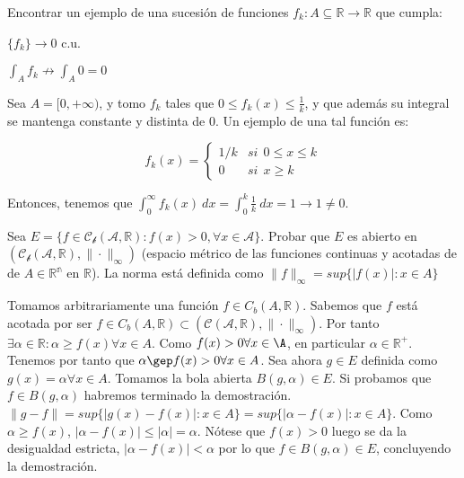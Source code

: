 \begin{ejer}
  Encontrar un ejemplo de una sucesión de funciones $f_k: A \subseteq \mathbb{R} \to \mathbb{R}$ que cumpla:
  \begin{nlist}
  \item $\{f_k\} \to 0$ c.u.
  \item $\displaystyle \int_A f_k \not \to \int_A 0 = 0$
  \end{nlist}
\end{ejer}

\begin{sol}
    Sea $A = [0,+\infty)$, y tomo $f_k$ tales que $0 \le f_k(x) \le \frac{1}{k}$, y que además su integral se mantenga constante y distinta de 0. Un ejemplo de una tal función es:

    $$f_k(x) =
    \begin{cases}
      1/k & si \ \ 0 \le x \le k \\
      0 & si \ \ x \ge k
    \end{cases}$$

    Entonces, tenemos que $\displaystyle \int_0^\infty f_k(x)\ dx = \int_0^k \frac{1}{k}\ dx = 1 \to 1 \ne 0 $.
  \end{sol}

\begin{ejer}
  Sea $E= \{ f \in \mathcal{C_b} ( \mathcal{A} , \mathbb{R} ) : f(x)>0, \forall x \in \mathcal{A} \}$. Probar que $E$ es abierto en $( \mathcal{C_b} ( \mathcal{A} , \mathbb{R} ) , \| \cdot \|_\infty )$ (espacio métrico de las funciones continuas y acotadas de de $A \in \mathbb{R^{n}}$ en $\mathbb{R}$).
  La norma está definida como $\|f\|_{\infty} = sup \{|f(x)|: x \in A\}$
  
\end{ejer}

\begin{sol}
    Tomamos arbitrariamente una función $f \in C_b(A,\mathbb{R})$. Sabemos que $f$ está acotada por ser $f \in C_b(A,\mathbb{R}) \subset ( \mathcal{C} ( \mathcal{A} , \mathbb{R} ) , \| \cdot \|_\infty )$. Por tanto $ \exists \alpha \in \mathbb{R} : \alpha \geq f(x) \forall x \in A$. Como $f(x) > 0 \forall x \in \A$, en particular $\alpha \in \mathbb{R^+}.$ Tenemos por tanto que $\alpha \gep f(x) > 0 \forall x \in A$.
    Sea ahora $g \in E$ definida como $g(x) = \alpha \forall x \in A$. Tomamos la bola abierta $B(g,\alpha) \in E$. Si probamos que $f \in B(g,\alpha)$ habremos terminado la demostración. $ \|g - f\| = sup \{ |g(x) - f(x)| : x \in A\} = sup \{ |\alpha - f(x)| : x \in A\}$. Como $\alpha \geq f(x)$, $|\alpha - f(x)| \leq |\alpha| = \alpha.$ Nótese que $f(x) > 0$ luego se da la desigualdad estricta, $|\alpha - f(x)| < \alpha$ por lo que $f \in B(g,\alpha) \in E$, concluyendo la demostración.    
  \end{sol}
  
